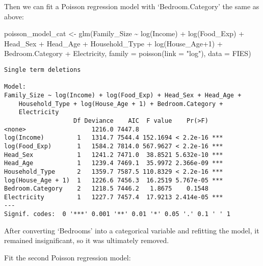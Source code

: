\documentclass[
]{article}
\newenvironment{Shaded}{\begin{snugshade}}{\end{snugshade}}
\newcommand{\AttributeTok}[1]{\textcolor[rgb]{0.40,0.45,0.13}{#1}}
\newcommand{\DecValTok}[1]{\textcolor[rgb]{0.68,0.00,0.00}{#1}}
\newcommand{\FunctionTok}[1]{\textcolor[rgb]{0.28,0.35,0.67}{#1}}
\newcommand{\NormalTok}[1]{\textcolor[rgb]{0.00,0.23,0.31}{#1}}
\newcommand{\OtherTok}[1]{\textcolor[rgb]{0.00,0.23,0.31}{#1}}
\newcommand{\SpecialCharTok}[1]{\textcolor[rgb]{0.37,0.37,0.37}{#1}}
\newcommand{\StringTok}[1]{\textcolor[rgb]{0.13,0.47,0.30}{#1}}
\begin{document}
Then we can fit a Poisson regression model with `Bedroom.Category' the
same as above:

\begin{Shaded}
\begin{Highlighting}[]
\NormalTok{poisson\_model\_cat }\OtherTok{\textless{}{-}} \FunctionTok{glm}\NormalTok{(Family\_Size }\SpecialCharTok{\textasciitilde{}} 
                       \FunctionTok{log}\NormalTok{(Income) }\SpecialCharTok{+}
                       \FunctionTok{log}\NormalTok{(Food\_Exp) }\SpecialCharTok{+}
\NormalTok{                       Head\_Sex }\SpecialCharTok{+}
\NormalTok{                       Head\_Age }\SpecialCharTok{+} 
\NormalTok{                       Household\_Type }\SpecialCharTok{+}
                       \FunctionTok{log}\NormalTok{(House\_Age}\SpecialCharTok{+}\DecValTok{1}\NormalTok{) }\SpecialCharTok{+}
\NormalTok{                       Bedroom.Category }\SpecialCharTok{+}
\NormalTok{                       Electricity, }
                     \AttributeTok{family =} \FunctionTok{poisson}\NormalTok{(}\AttributeTok{link =} \StringTok{"log"}\NormalTok{),}
                     \AttributeTok{data =}\NormalTok{ FIES) }
\end{Highlighting}
\end{Shaded}

\begin{verbatim}
Single term deletions

Model:
Family_Size ~ log(Income) + log(Food_Exp) + Head_Sex + Head_Age + 
    Household_Type + log(House_Age + 1) + Bedroom.Category + 
    Electricity
                   Df Deviance    AIC  F value    Pr(>F)    
<none>                  1216.0 7447.8                       
log(Income)         1   1314.7 7544.4 152.1694 < 2.2e-16 ***
log(Food_Exp)       1   1584.2 7814.0 567.9627 < 2.2e-16 ***
Head_Sex            1   1241.2 7471.0  38.8521 5.632e-10 ***
Head_Age            1   1239.4 7469.1  35.9972 2.366e-09 ***
Household_Type      2   1359.7 7587.5 110.8329 < 2.2e-16 ***
log(House_Age + 1)  1   1226.6 7456.3  16.2519 5.767e-05 ***
Bedroom.Category    2   1218.5 7446.2   1.8675    0.1548    
Electricity         1   1227.7 7457.4  17.9213 2.414e-05 ***
---
Signif. codes:  0 '***' 0.001 '**' 0.01 '*' 0.05 '.' 0.1 ' ' 1
\end{verbatim}

After converting `Bedrooms' into a categorical variable and refitting
the model, it remained insignificant, so it was ultimately removed.

Fit the second Poisson regression model:
\end{document}
